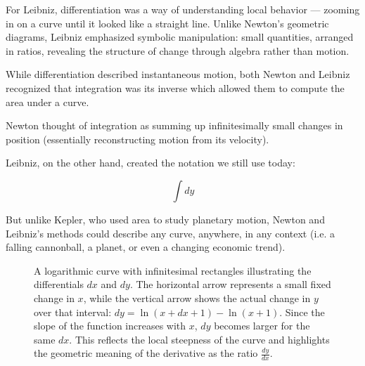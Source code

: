 For Leibniz, differentiation was a way of understanding local behavior — zooming in on a curve until it looked like a straight line. Unlike Newton’s geometric diagrams, Leibniz emphasized symbolic manipulation: small quantities, arranged in ratios, revealing the structure of change through algebra rather than motion.

While differentiation described instantaneous motion, both Newton and Leibniz recognized that integration was its inverse which allowed them to compute the area under a curve.  

Newton thought of integration as summing up infinitesimally small changes in position (essentially reconstructing motion from its velocity).  

Leibniz, on the other hand, created the notation we still use today:

\[
\int dy
\]

But unlike Kepler, who used area to study planetary motion, Newton and Leibniz’s methods could describe any curve, anywhere, in any context (i.e. a falling cannonball, a planet, or even a changing economic trend).  

\begin{figure}[H]
\centering
{}

\vspace{0.5em}
\caption{\small A logarithmic curve with infinitesimal rectangles illustrating the differentials $dx$ and $dy$. The horizontal arrow represents a small fixed change in $x$, while the vertical arrow shows the actual change in $y$ over that interval: $dy = \ln(x+dx+1) - \ln(x+1)$. Since the slope of the function increases with $x$, $dy$ becomes larger for the same $dx$. This reflects the local steepness of the curve and highlights the geometric meaning of the derivative as the ratio $\frac{dy}{dx}$.}
\end{figure}


